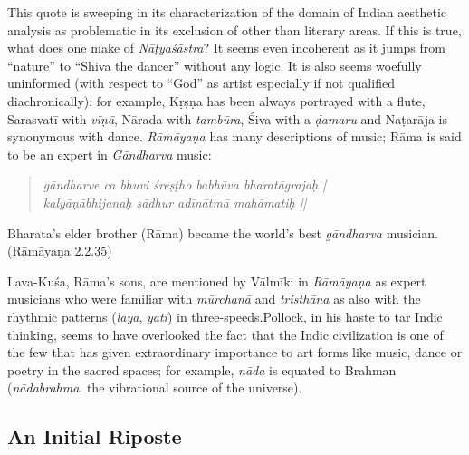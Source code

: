 This quote is sweeping in its characterization of the domain of Indian aesthetic analysis as problematic in its exclusion of other than literary areas. If this is true, what does one make of \textsl{Nāṭyaśāstra}? It seems even incoherent as it jumps from “nature” to “Shiva the dancer” without any logic. It is also seems woefully uninformed (with respect to “God” as artist especially if not qualified diachronically): for example, Kṛṣṇa has been always portrayed with a flute, Sarasvatī with \textsl{vīṇā}, Nārada with \textsl{tambūra}, Śiva with a \textsl{ḍamaru} and Naṭarāja is synonymous with dance. \textsl{Rāmāyaṇa} has many descriptions of music; Rāma is said to be an expert in \textsl{Gāndharva} music:

\begin{quote}
\textsl{gāndharve ca bhuvi śreṣṭho babhūva bharatāgrajaḥ |}\\
\textsl{kalyāṇābhijanaḥ sādhur adīnātmā mahāmatiḥ ||}
\end{quote}

Bharata’s elder brother (Rāma) became the world’s best \textsl{gāndharva} musician. (Rāmāyaṇa 2.2.35)

Lava-Kuśa, Rāma’s sons, are mentioned by Vālmīki in \textsl{Rāmāyaṇa} as expert musicians who were familiar with \textsl{mūrchanā} and \textsl{tristhāna} as also with the rhythmic patterns (\textsl{laya}, \textsl{yati}) in three-speeds.Pollock, in his haste to tar Indic thinking, seems to have overlooked the fact that the Indic civilization is one of the few that has given extraordinary importance to art forms like music, dance or poetry in the sacred spaces; for example, \textsl{nāda} is equated to Brahman (\textsl{nādabrahma}, the vibrational source of the universe).

\subsection{An Initial Riposte}\label{chap7-sec1.1}

